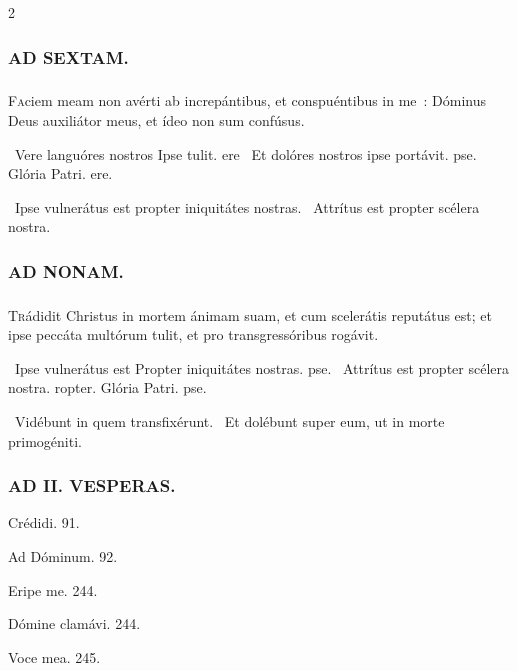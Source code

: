 \documentclass[9pt,twoside]{extarticle}
\begin{document}
\begin{multicols}{2}
{{\subsubsection*{\center \textsc{AD SEXTAM.}}
\subsubsection*{}
\lettrine{F}aciem meam non avérti ab increpántibus, et conspuéntibus in me~: Dóminus Deus auxiliátor meus, et ídeo non sum confúsus.

\begin{tightlist}{}
\item {}~Vere languóres nostros \textred{*} Ipse tulit. ere ~Et dolóres nostros ipse portávit. pse. Glória Patri. ere.
\item {}~Ipse vulnerátus est propter iniquitátes nostras. ~Attrítus est propter scélera nostra.
\end{tightlist}

\subsubsection*{\center \textsc{AD NONAM.}}
\subsubsection*{}
\lettrine{T}rádidit Christus in mortem ánimam suam, et cum scelerátis reputátus est; et ipse peccáta multórum tulit, et pro transgressóribus rogávit.

\begin{tightlist}{}
\item {}~Ipse vulnerátus est \textred{*} Propter iniquitátes nostras. pse. ~Attrítus est propter scélera nostra. ropter. Glória Patri. pse.
\item {}~Vidébunt in quem transfixérunt. ~Et dolébunt super eum, ut in morte primogéniti.
\end{tightlist}

\subsubsection*{\center \textsc{AD II. VESPERAS.}}
\begin{tightlist}{}
\item {}
\item {} Crédidi. 91. 
\item {} Ad Dóminum. 92. 
\item {} Eripe me. 244. 
\item {} Dómine clamávi. 244. 
\item {} Voce mea. 245.
\end{tightlist}

}}
\end{multicols}
\end{document}
